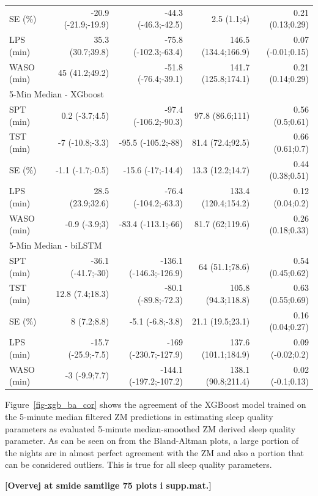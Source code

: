 \documentclass[
  super,
  preprint,
  3p]{elsarticle}
\begin{document}
\begin{longtable}{lrrrr}
SE (\%) & -20.9 (-21.9;-19.9) & -44.3 (-46.3;-42.5) & 2.5 (1.1;4) & 0.21 (0.13;0.29) \\ 
LPS (min) & 35.3 (30.7;39.8) & -75.8 (-102.3;-63.4) & 146.5 (134.4;166.9) & 0.07 (-0.01;0.15) \\ 
WASO (min) & 45 (41.2;49.2) & -51.8 (-76.4;-39.1) & 141.7 (125.8;174.1) & 0.21 (0.14;0.29) \\ 
\midrule
\multicolumn{5}{l}{5-Min Median - XGboost} \\ 
\midrule
SPT (min) & 0.2 (-3.7;4.5) & -97.4 (-106.2;-90.3) & 97.8 (86.6;111) & 0.56 (0.5;0.61) \\ 
TST (min) & -7 (-10.8;-3.3) & -95.5 (-105.2;-88) & 81.4 (72.4;92.5) & 0.66 (0.61;0.7) \\ 
SE (\%) & -1.1 (-1.7;-0.5) & -15.6 (-17;-14.4) & 13.3 (12.2;14.7) & 0.44 (0.38;0.51) \\ 
LPS (min) & 28.5 (23.9;32.6) & -76.4 (-104.2;-63.3) & 133.4 (120.4;154.2) & 0.12 (0.04;0.2) \\ 
WASO (min) & -0.9 (-3.9;3) & -83.4 (-113.1;-66) & 81.7 (62;119.6) & 0.26 (0.18;0.33) \\ 
\midrule
\multicolumn{5}{l}{5-Min Median - biLSTM} \\ 
\midrule
SPT (min) & -36.1 (-41.7;-30) & -136.1 (-146.3;-126.9) & 64 (51.1;78.6) & 0.54 (0.45;0.62) \\ 
TST (min) & 12.8 (7.4;18.3) & -80.1 (-89.8;-72.3) & 105.8 (94.3;118.8) & 0.63 (0.55;0.69) \\ 
SE (\%) & 8 (7.2;8.8) & -5.1 (-6.8;-3.8) & 21.1 (19.5;23.1) & 0.16 (0.04;0.27) \\ 
LPS (min) & -15.7 (-25.9;-7.5) & -169 (-230.7;-127.9) & 137.6 (101.1;184.9) & 0.09 (-0.02;0.2) \\ 
WASO (min) & -3 (-9.9;7.7) & -144.1 (-197.2;-107.2) & 138.1 (90.8;211.4) & 0.02 (-0.1;0.13) \\ 
\bottomrule
\end{longtable}

Figure~\ref{fig-xgb_ba_cor} shows the agreement of the XGBoost model
trained on the 5-minute median filtered ZM predictions in estimating
sleep quality parameters as evaluated 5-minute median-smoothed ZM
derived sleep quality parameter. As can be seen on from the Bland-Altman
plots, a large portion of the nights are in almost perfect agreement
with the ZM and also a portion that can be considered outliers. This is
true for all sleep quality parameters.

\textbf{{[}Overvej at smide samtlige 75 plots i supp.mat.{]}}
\end{document}
